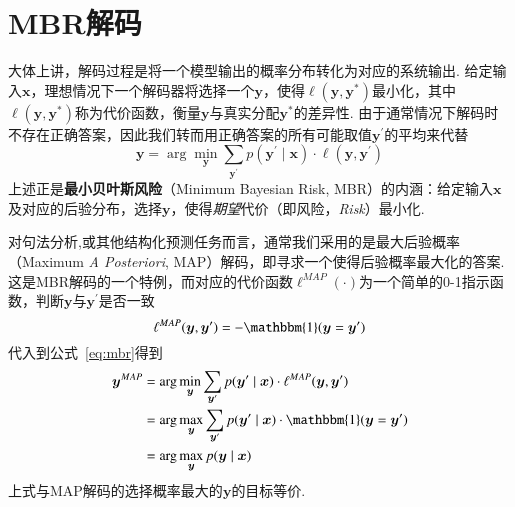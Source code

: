 \section{MBR解码}\label{sec:mbr-decoding}
大体上讲，解码过程是将一个模型输出的概率分布转化为对应的系统输出.
给定输入$\boldsymbol{x}$，理想情况下一个解码器将选择一个$\boldsymbol{y}$，使得$\ell(\boldsymbol{y},\boldsymbol{y}^{\ast})$最小化，其中$\ell(\boldsymbol{y},\boldsymbol{y}^{\ast})$称为代价函数，衡量$\boldsymbol{y}$与真实分配$\boldsymbol{y}^{\ast}$的差异性.
由于通常情况下解码时不存在正确答案，因此我们转而用正确答案的所有可能取值$\boldsymbol{y}^{\prime}$的平均来代替
\begin{equation}
    \label{eq:mbr}
    \boldsymbol{y}= \arg\min_{\boldsymbol{y}}\sum_{\boldsymbol{y}^{\prime}}p(\boldsymbol{y}^{\prime}\mid\boldsymbol{x})\cdot\ell(\boldsymbol{y},\boldsymbol{y}^{\prime})
\end{equation}
上述正是\textbf{最小贝叶斯风险}（Minimum Bayesian Risk, MBR）的内涵：给定输入$\boldsymbol{x}$及对应的后验分布，选择$\boldsymbol{y}$，使得\textit{期望}代价（即风险，\textit{Risk}）最小化\cite{stoyanov-eisner-2012-minimum}.

对句法分析,或其他结构化预测任务而言，通常我们采用的是最大后验概率（Maximum \textit{A Posteriori}, MAP）解码，即寻求一个使得后验概率最大化的答案.
这是MBR解码的一个特例，而对应的代价函数$\ell^{MAP}(\cdot)$为一个简单的0-1指示函数，判断$\boldsymbol{y}$与$\boldsymbol{y}^{\prime}$是否一致
\begin{equation}
    \ell^{MAP}(\boldsymbol{y},\boldsymbol{y}^{\prime}) = -\mathbbm{1}(\boldsymbol{y}=\boldsymbol{y}^{\prime})
\end{equation}
代入到公式~\ref{eq:mbr}得到
\begin{equation}
    \label{eq:map}
    \begin{split}
        \boldsymbol{y}^{MAP}&= \arg\min_{\boldsymbol{y}}\sum_{\boldsymbol{y}^{\prime}}p(\boldsymbol{y}^{\prime}\mid\boldsymbol{x})\cdot\ell^{MAP}(\boldsymbol{y},\boldsymbol{y}^{\prime})\\
        &=\arg\max_{\boldsymbol{y}}\sum_{\boldsymbol{y}^{\prime}}p(\boldsymbol{y}^{\prime}\mid\boldsymbol{x})\cdot\mathbbm{1}(\boldsymbol{y}=\boldsymbol{y}^{\prime})\\
        &=\arg\max_{\boldsymbol{y}}p(\boldsymbol{y}\mid\boldsymbol{x})
    \end{split}
\end{equation}
上式与MAP解码的选择概率最大的$\boldsymbol{y}$的目标等价.

